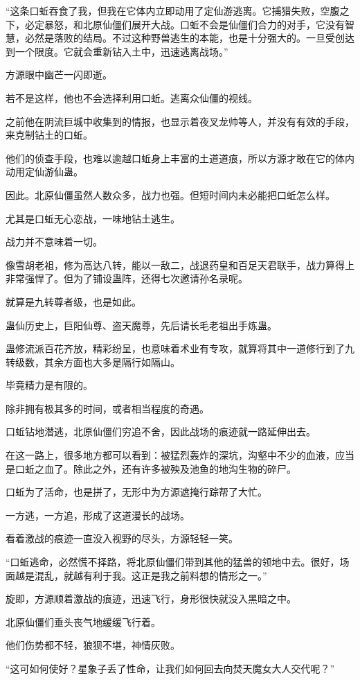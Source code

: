 \begin{this_body}
“这条口蚯吞食了我，但我在它体内立即动用了定仙游逃离。它捕猎失败，空腹之下，必定暴怒，和北原仙僵们展开大战。口蚯不会是仙僵们合力的对手，它没有智慧，必然是落败的结局。不过这种野兽逃生的本能，也是十分强大的。一旦受创达到一个限度。它就会重新钻入土中，迅速逃离战场。”

方源眼中幽芒一闪即逝。

若不是这样，他也不会选择利用口蚯。逃离众仙僵的视线。

之前他在阴流巨城中收集到的情报，也显示着夜叉龙帅等人，并没有有效的手段，来克制钻土的口蚯。

他们的侦查手段，也难以逾越口蚯身上丰富的土道道痕，所以方源才敢在它的体内动用定仙游仙蛊。

因此。北原仙僵虽然人数众多，战力也强。但短时间内未必能把口蚯怎么样。

尤其是口蚯无心恋战，一味地钻土逃生。

战力并不意味着一切。

像雪胡老祖，修为高达八转，能以一敌二，战退药皇和百足天君联手，战力算得上非常强悍了。但为了铺设蛊阵，还得七次邀请孙名录呢。

就算是九转尊者级，也是如此。

蛊仙历史上，巨阳仙尊、盗天魔尊，先后请长毛老祖出手炼蛊。

蛊修流派百花齐放，精彩纷呈，也意味着术业有专攻，就算将其中一道修行到了九转级数，其余方面也大多是隔行如隔山。

毕竟精力是有限的。

除非拥有极其多的时间，或者相当程度的奇遇。

口蚯钻地潜逃，北原仙僵们穷追不舍，因此战场的痕迹就一路延伸出去。

在这一路上，很多地方都可以看到：被猛烈轰炸的深坑，沟壑中不少的血液，应当是口蚯之血了。除此之外，还有许多被殃及池鱼的地沟生物的碎尸。

口蚯为了活命，也是拼了，无形中为方源遮掩行踪帮了大忙。

一方逃，一方追，形成了这道漫长的战场。

看着激战的痕迹一直没入视野的尽头，方源轻轻一笑。

“口蚯逃命，必然慌不择路，将北原仙僵们带到其他的猛兽的领地中去。很好，场面越是混乱，就越有利于我。这正是我之前料想的情形之一。”

旋即，方源顺着激战的痕迹，迅速飞行，身形很快就没入黑暗之中。

北原仙僵们垂头丧气地缓缓飞行着。

他们伤势都不轻，狼狈不堪，神情灰败。

“这可如何使好？星象子丢了性命，让我们如何回去向焚天魔女大人交代呢？”


\end{this_body}
